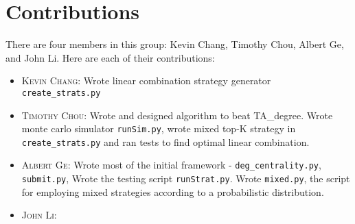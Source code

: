 \documentclass{article}
\begin{document}
\section{Contributions}
There are four members in this group: Kevin Chang, Timothy Chou, Albert Ge, and John Li. Here are each of their contributions:
\begin{itemize}
  \item \textsc{Kevin Chang}: Wrote linear combination strategy generator \texttt{create\_strats.py}
  \item \textsc{Timothy Chou}: Wrote and designed algorithm to beat TA\_degree. Wrote monte carlo simulator \texttt{runSim.py}, wrote mixed top-K strategy in \texttt{create\_strats.py} and ran tests to find optimal linear combination.
    \item \textsc{Albert Ge}: Wrote most of the initial framework - \texttt{deg\_centrality.py}, \texttt{submit.py}, 
  Wrote the testing script \texttt{runStrat.py}. 
  Wrote \texttt{mixed.py}, the script for employing mixed strategies according to
  a probabilistic distribution.
  \item \textsc{John Li}: 
 \end{itemize}




\end{document}
